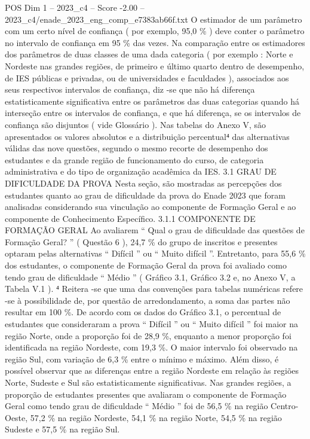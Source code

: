 \begin{textsample}{POS Dim 1 – 2023\_c4 – Score -2.00 – 2023\_c4/enade\_2023\_eng\_comp\_e7383ab66f.txt}
O estimador de um parâmetro com um certo nível de confiança ( por exemplo, 95,0 \% ) deve conter o parâmetro no intervalo de confiança em 95 \% das vezes.
Na comparação entre os estimadores dos parâmetros de duas classes de uma dada categoria ( por exemplo : Norte e Nordeste nas grandes regiões, de primeiro e último quarto dentro de desempenho, de IES públicas e privadas, ou de universidades e faculdades ), associados aos seus respectivos intervalos de confiança, diz -se que não há diferença estatisticamente significativa entre os parâmetros das duas categorias quando há interseção entre os intervalos de confiança, e que há diferença, se os intervalos de confiança são disjuntos ( vide Glossário ).
Nas tabelas do Anexo V, são apresentados os valores absolutos e a distribuição percentual⁴ das alternativas válidas das nove questões, segundo o mesmo recorte de desempenho dos estudantes e da grande região de funcionamento do curso, de categoria administrativa e do tipo de organização acadêmica da IES. 3.1 GRAU DE DIFICULDADE DA PROVA Nesta seção, são mostradas as percepções dos estudantes quanto ao grau de dificuldade da prova do Enade 2023 que foram analisadas considerando sua vinculação ao componente de Formação Geral e ao componente de Conhecimento Específico. 3.1.1 COMPONENTE DE FORMAÇÃO GERAL Ao avaliarem “ Qual o grau de dificuldade das questões de Formação Geral? ” ( Questão 6 ), 24,7 \% do grupo de inscritos e presentes optaram pelas alternativas “ Difícil ” ou “ Muito difícil ”.
Entretanto, para 55,6 \% dos estudantes, o componente de Formação Geral da prova foi avaliado como tendo grau de dificuldade “ Médio ” ( Gráfico 3.1, Gráfico 3.2 e, no Anexo V, a Tabela V.1 ). ⁴ Reitera -se que uma das convenções para tabelas numéricas refere -se à possibilidade de, por questão de arredondamento, a soma das partes não resultar em 100 \%.
De acordo com os dados do Gráfico 3.1, o percentual de estudantes que consideraram a prova “ Difícil ” ou “ Muito difícil ” foi maior na região Norte, onde a proporção foi de 28,9 \%, enquanto a menor proporção foi identificada na região Nordeste, com 19,3 \%.
O maior intervalo foi observado na região Sul, com variação de 6,3 \% entre o mínimo e máximo.
Além disso, é possível observar que as diferenças entre a região Nordeste em relação às regiões Norte, Sudeste e Sul são estatisticamente significativas.
Nas grandes regiões, a proporção de estudantes presentes que avaliaram o componente de Formação Geral como tendo grau de dificuldade “ Médio ” foi de 56,5 \% na região Centro-Oeste, 57,2 \% na região Nordeste, 54,1 \% na região Norte, 54,5 \% na região Sudeste e 57,5 \% na região Sul.

\end{textsample}
